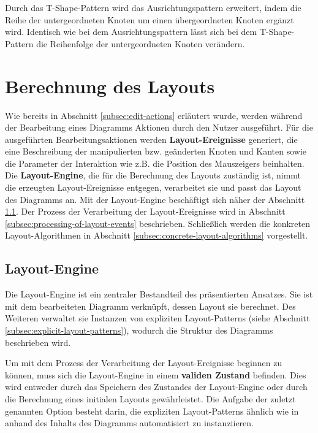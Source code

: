 Durch das T-Shape-Pattern wird das Ausrichtungspattern erweitert, indem die Reihe der untergeordneten Knoten um einen übergeordneten Knoten ergänzt wird. Identisch wie bei dem Ausrichtungspattern lässt sich bei dem T-Shape-Pattern die Reihenfolge der untergeordneten Knoten verändern.


\section{Berechnung des Layouts}
\label{sec:layout-calculation}

Wie bereits in Abschnitt \ref{subsec:edit-actions} erläutert wurde, werden während der Bearbeitung eines Diagramms Aktionen durch den Nutzer ausgeführt. Für die ausgeführten Bearbeitungsaktionen werden \textbf{Layout-Ereignisse} generiert, die eine Beschreibung der manipulierten bzw. geänderten Knoten und Kanten sowie die Parameter der Interaktion wie z.B. die Position des Mauszeigers beinhalten. Die \textbf{Layout-Engine}, die für die Berechnung des Layouts zuständig ist, nimmt die erzeugten Layout-Ereignisse entgegen, verarbeitet sie und passt das Layout des Diagramms an. Mit der Layout-Engine beschäftigt sich näher der Abschnitt \ref{subsec:layout-engine}. Der Prozess der Verarbeitung der Layout-Ereignisse wird in Abschnitt \ref{subsec:processing-of-layout-events} beschrieben. Schließlich werden die konkreten Layout-Algorithmen in Abschnitt \ref{subsec:concrete-layout-algorithms} vorgestellt.

\subsection{Layout-Engine}
\label{subsec:layout-engine}

Die Layout-Engine ist ein zentraler Bestandteil des präsentierten Ansatzes. Sie ist mit dem bearbeiteten Diagramm verknüpft, dessen Layout sie berechnet. Des Weiteren verwaltet sie Instanzen von expliziten Layout-Patterns (siehe Abschnitt \ref{subsec:explicit-layout-patterns}), wodurch die Struktur des Diagramms beschrieben wird.

Um mit dem Prozess der Verarbeitung der Layout-Ereignisse beginnen zu können, muss sich die Layout-Engine in einem \textbf{validen Zustand} befinden. Dies wird entweder durch das Speichern des Zustandes der Layout-Engine oder durch die Berechnung eines initialen Layouts gewährleistet. Die Aufgabe der zuletzt genannten Option besteht darin, die expliziten Layout-Patterns ähnlich wie in \cite{MaierMinas13A-Pattern-based} anhand des Inhalts des Diagramms automatisiert zu instanziieren.

